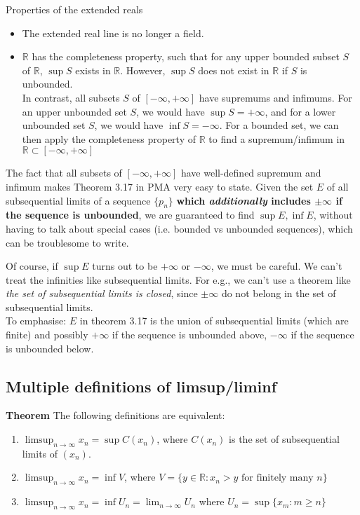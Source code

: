 \documentclass{article}
\begin{document}
Properties of the extended reals
\begin{itemize}
	\item The extended real line is no longer a field.
	\item $\mathbb{R}$ has the completeness property, such that for any upper bounded subset $S$ of $\mathbb{R}$, $\sup S$ exists in $\mathbb{R}$. However, $\sup S$ does not exist in $\mathbb{R}$ if $S$ is unbounded.\\
	 In contrast, all subsets $S$ of $[-\infty, +\infty]$ have supremums and infimums. For an upper unbounded set $S$, we would have $\sup S = + \infty$, and for a lower unbounded set $S$, we would have $\inf S = -\infty$. For a bounded set, we can then apply the completeness property of $\mathbb{R}$ to find a supremum/infimum in $\mathbb{R}\subset [-\infty, +\infty]$
\end{itemize}

The fact that all subsets of $[-\infty, +\infty]$ have well-defined supremum and infimum makes Theorem 3.17 in PMA very easy to state. Given the set $E$ of all subsequential limits of a sequence $\{p_n\}$ \textbf{which \textit{additionally} includes $\pm \infty$ if the sequence is unbounded}, we are guaranteed to find $\sup E, \inf E$, without having to talk about special cases (i.e. bounded vs unbounded sequences), which can be troublesome to write.

Of course, if $\sup E$ turns out to be $+\infty$ or $-\infty$, we must be careful. We can't treat the infinities like subsequential limits. For e.g., we can't use a theorem like \textit{the set of subsequential limits is closed}, since $\pm \infty$ do not belong in the set of subsequential limits.\\
To emphasise: $E$ in theorem 3.17 is the union of subsequential limits (which are finite) and possibly $+\infty$ if the sequence is unbounded above, $-\infty$ if the sequence is unbounded below.


\subsection{Multiple definitions of limsup/liminf}
\textbf{Theorem} The following definitions are equivalent:
\begin{enumerate}
	\item $\limsup_{n\rightarrow \infty}x_n=\sup C(x_n)$, where $C(x_n)$ is the set of subsequential limits of $(x_n)$.
	\item $\limsup_{n\rightarrow \infty}x_n=\inf V$, where $V=\{y\in \mathbb{R}:x_n>y \text{ for finitely many } n\}$
	\item $\limsup_{n\rightarrow \infty}x_n=\inf U_n=\lim_{n\rightarrow \infty}U_n$ where $U_n=\sup\{x_m:m\geq n\}$
\end{enumerate}
\end{document}
